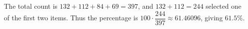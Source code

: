 The total count is $ 132+112+84+69=397 $, and $ 132+112=244 $ selected one of the first two items. Thus the percentage is $ 100\cdot\dfrac{244}{397}\approx61.46096 $, giving $\boxed{61.5\%}$.
